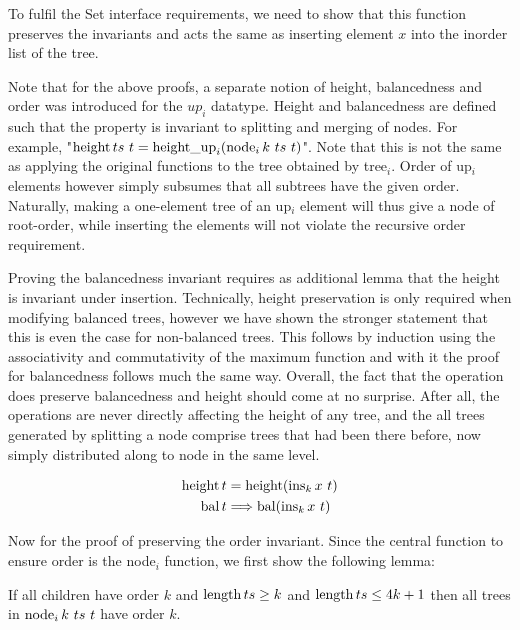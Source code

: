 To fulfil the Set interface requirements,
we need to show that this function preserves the invariants
and acts the same as inserting element $x$ into the inorder list of the tree.

Note that for the above proofs, a separate notion of height, balancedness and order
was introduced for the $up_i$ datatype.
Height and balancedness are
defined such that the property is invariant to splitting and merging of nodes.
For example, "$\height ts\ t = \heightup_i (\node_i k\ ts\ t)$".
Note that this is not the same as applying the original functions
to the tree obtained by tree$_i$.
Order of up$_i$ elements however simply subsumes that all subtrees have
the given order.
Naturally, making a one-element tree of an up$_i$ element will thus
give a node of root-order, while inserting the elements
will not violate the recursive order requirement.

Proving the balancedness invariant requires as additional lemma that
the height is invariant under insertion.
Technically, height preservation is only required when modifying balanced
trees, however we have shown the stronger statement that this is even the case for non-balanced trees.
This follows by induction using the
associativity and commutativity of the maximum function
and with it the proof for balancedness follows much the same way.
Overall, the fact that the operation does preserve balancedness and
height should come at no surprise.
After all, the operations are never directly affecting the height of any tree,
and the all trees generated by splitting a node comprise trees
that had been there before, now simply distributed along to node
in the same level.

\begin{lemma}
    \begin{align*}
    \operatorname{height} t & = \operatorname{height} (\operatorname{ins}_k x\ t) \\
    \operatorname{bal} t & \Longrightarrow \operatorname{bal} (\operatorname{ins}_k x\ t)
    \end{align*}
\end{lemma}

Now for the proof of preserving the order invariant.
Since the central function to ensure order is the node$_i$ function,
we first show the following lemma:

\begin{lemma}
\label{lem:nodei-order}
    If all children have order $k$ and $\operatorname{length} ts \ge k$ and $\operatorname{length} ts \le 4k+1$
    then all trees in $\operatorname{node}_i k\ ts\ t$ have order $k$.
\end{lemma}

